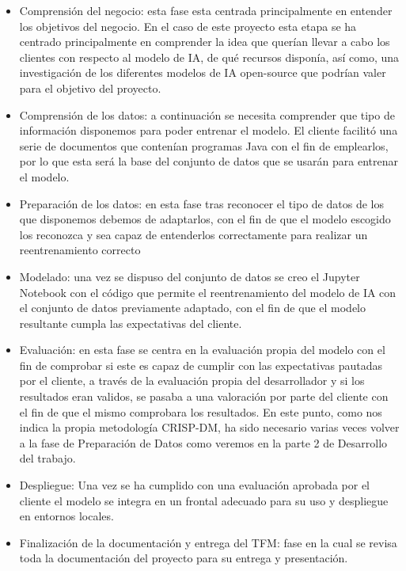 \begin{itemize}
\item Comprensión del negocio: esta fase esta centrada principalmente en entender los objetivos del negocio. En el caso de este proyecto esta etapa se ha centrado principalmente en comprender la idea que querían llevar a cabo los clientes con respecto al modelo de IA, de qué recursos disponía, así como, una investigación de los diferentes modelos de IA open-source que podrían valer para el objetivo del proyecto.

\item Comprensión de los datos: a continuación se necesita comprender que tipo de información disponemos para poder entrenar el modelo. El cliente facilitó una serie de documentos que contenían programas Java con el fin de emplearlos, por lo que esta será la base del conjunto de datos que se usarán para entrenar el modelo.

\item Preparación de los datos: en esta fase tras reconocer el tipo de datos de los que disponemos debemos de adaptarlos, con el fin de que el modelo escogido los reconozca y sea capaz de entenderlos correctamente para realizar un reentrenamiento correcto

\item Modelado: una vez se dispuso del conjunto de datos se creo el Jupyter Notebook con el código que permite el reentrenamiento del modelo de IA con el conjunto de datos previamente adaptado, con el fin de que el modelo resultante cumpla las expectativas del cliente.

\item Evaluación: en esta fase se centra en la evaluación propia del modelo con el fin de comprobar si este es capaz de cumplir con las expectativas pautadas por el cliente, a través de la evaluación propia del desarrollador y si los resultados eran validos, se pasaba a una valoración por parte del cliente con el fin de que el mismo comprobara los resultados. En este punto, como nos indica la propia metodología CRISP-DM, ha sido necesario varias veces volver a la fase de Preparación de Datos como veremos en la parte 2 de Desarrollo del trabajo.

\item Despliegue: Una vez se ha cumplido con una evaluación aprobada por el cliente el modelo se integra en un frontal adecuado para su uso y despliegue en entornos locales.

\item Finalización de la documentación y entrega del TFM: fase en la cual se revisa toda la documentación del proyecto para su entrega y presentación.

\end{itemize}


